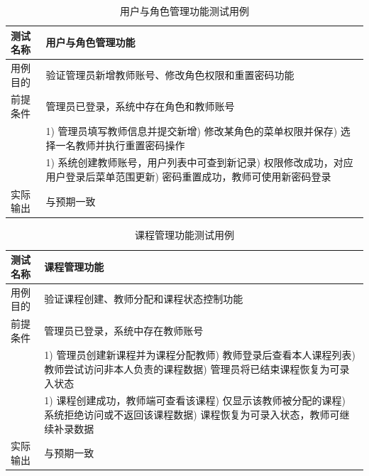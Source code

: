 \begin{table}[H]
  \centering
  \caption{用户与角色管理功能测试用例}
  \label{tab:tc-user-role}
  \footnotesize
  \renewcommand{\arraystretch}{1.35}
  \begin{tabularx}{\textwidth}{|L{2.4cm}|X|}
    \hline
    测试名称 & 用户与角色管理功能 \\
    \hline
    用例目的 & 验证管理员新增教师账号、修改角色权限和重置密码功能 \\
    \hline
    前提条件 & 管理员已登录，系统中存在角色和教师账号 \\
    \hline
     &
      1) 管理员填写教师信息并提交新增) 修改某角色的菜单权限并保存) 选择一名教师并执行重置密码操作 \\
    \hline
     &
      1) 系统创建教师账号，用户列表中可查到新记录) 权限修改成功，对应用户登录后菜单范围更新) 密码重置成功，教师可使用新密码登录 \\
    \hline
    实际输出 & 与预期一致 \\
    \hline
  \end{tabularx}
\end{table}

\begin{table}[H]
  \centering
  \caption{课程管理功能测试用例}
  \label{tab:tc-course}
  \footnotesize
  \renewcommand{\arraystretch}{1.35}
  \begin{tabularx}{\textwidth}{|L{2.4cm}|X|}
    \hline
    测试名称 & 课程管理功能 \\
    \hline
    用例目的 & 验证课程创建、教师分配和课程状态控制功能 \\
    \hline
    前提条件 & 管理员已登录，系统中存在教师账号 \\
    \hline
     &
      1) 管理员创建新课程并为课程分配教师) 教师登录后查看本人课程列表) 教师尝试访问非本人负责的课程数据) 管理员将已结束课程恢复为可录入状态 \\
    \hline
     &
      1) 课程创建成功，教师端可查看该课程) 仅显示该教师被分配的课程) 系统拒绝访问或不返回该课程数据) 课程恢复为可录入状态，教师可继续补录数据 \\
    \hline
    实际输出 & 与预期一致 \\
    \hline
  \end{tabularx}
\end{table}

